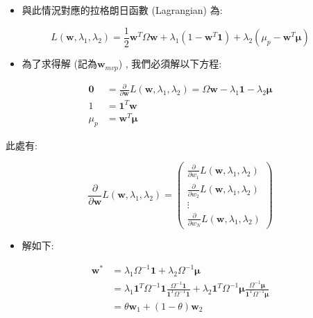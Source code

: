 \documentclass[letterpaper]{article}
\begin{document}
		\begin{itemize}
			\item 與此情況對應的拉格朗日函數 (Lagrangian) 為: 
		\end{itemize}
		
		$$
		L\left (\mathbf{w}, \lambda_{1}, \lambda_{2}\right) =\frac{1}{2} \mathbf{w}^{T} \Omega \mathbf{w}+\lambda_{1}\left (1-\mathbf{w}^{T} \mathbf{1}\right) +\lambda_{2}\left (\mu_{p}-\mathbf{w}^{T} \boldsymbol{\mu}\right) 
		$$
		
		\begin{itemize}
			\item 為了求得解 (記為$\mathbf{w}_{mvp}$) , 我們必須解以下方程: 
		\end{itemize}
		
		
		\begin{align*}
			\mathbf{0} & =\frac{\partial}{\partial \mathbf{w}} L\left (\mathbf{w}, \lambda_{1}, \lambda_{2}\right) =\Omega \mathbf{w}-\lambda_{1} \mathbf{1}-\lambda_{2} \boldsymbol{\mu}  \tag{3}\\
			1 & =\mathbf{1}^{T} \mathbf{w}  \tag{4}\\
			\mu_{p} & =\mathbf{w}^{T} \boldsymbol{\mu} \tag{5}
		\end{align*}
		
		
		此處有: 
		
		$$
		\frac{\partial}{\partial \mathbf{w}} L\left (\mathbf{w}, \lambda_{1}, \lambda_{2}\right) =\left (\begin{array}{c}
			\frac{\partial}{\partial w_{1}} L\left (\mathbf{w}, \lambda_{1}, \lambda_{2}\right) \\
			\frac{\partial}{\partial w_{2}} L\left (\mathbf{w}, \lambda_{1}, \lambda_{2}\right) \\
			\vdots \\
			\frac{\partial}{\partial w_{N}} L\left (\mathbf{w}, \lambda_{1}, \lambda_{2}\right) 
		\end{array}\right) 
		$$
		
		\begin{itemize}
			\item 解如下: 
		\end{itemize}
		
		$$
		\begin{aligned}
			\mathbf{w}^{*} & =\lambda_{1} \Omega^{-1} \mathbf{1}+\lambda_{2} \Omega^{-1} \boldsymbol{\mu} \\
			& =\lambda_{1} \mathbf{1}^{T} \Omega^{-1} \mathbf{1} \frac{\Omega^{-1} \mathbf{1}}{\mathbf{1}^{T} \Omega^{-1} \mathbf{1}}+\lambda_{2} \mathbf{1}^{T} \Omega^{-1} \boldsymbol{\mu} \frac{\Omega^{-1} \boldsymbol{\mu}}{\mathbf{1}^{T} \Omega^{-1} \boldsymbol{\mu}} \\
			& =\theta \mathbf{w}_{1}+ (1-\theta) \mathbf{w}_{2}
		\end{aligned}
		$$
		
\end{document}
